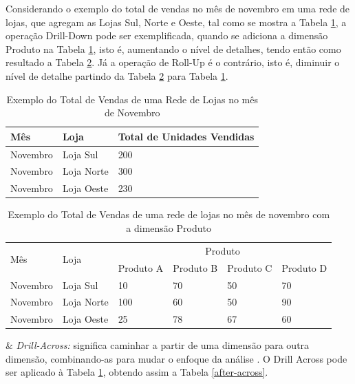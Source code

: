 Considerando o exemplo do total de vendas no mês de novembro em uma rede de lojas, que agregam as Lojas Sul, Norte e Oeste, tal como se mostra a Tabela \ref{before}, a operação Drill-Down pode ser exemplificada, quando se adiciona a dimensão Produto na Tabela \ref{before}, isto é, aumentando o nível de detalhes, tendo então como resultado a Tabela \ref{after}. Já a operação de Roll-Up é o contrário, isto é, diminuir o nível de detalhe partindo da Tabela 
\ref{after} para Tabela \ref{before}.

\begin{table}[!ht]
\centering
\begin{tabular}{|l|l|l|}
\hline
Mês & Loja & Total de Unidades Vendidas \\ \hline
Novembro & Loja Sul & 200                        \\ \hline
Novembro & Loja Norte & 300                        \\ \hline
Novembro & Loja Oeste & 230                        \\ \hline
\end{tabular}
\caption{Exemplo do Total de Vendas de uma Rede de Lojas no mês de Novembro}
\label{before}
\end{table}
\FloatBarrier


\begin{table}[!ht]
\centering
\begin{tabular}{|l|l|l|l|l|l|}
\hline
\multirow{2}{*}{Mês} & \multirow{2}{*}{Loja} & \multicolumn{4}{c|}{Produto}                 \\ \cline{3-6} 
                     &                       & Produto A & Produto B & Produto C & Produto D \\ \hline
Novembro             & Loja Sul              & 10        & 70        & 50        & 70        \\ \hline
Novembro             & Loja Norte            & 100       & 60        & 50        & 90        \\ \hline
Novembro             & Loja Oeste            & 25        & 78        & 67        & 60        \\ \hline
\end{tabular}
\caption{Exemplo do Total de Vendas de uma rede de lojas no mês de novembro com a dimensão Produto}
\label{after}
\end{table}

\begin{easylist}[itemize]

& \textit{Drill-Across:} significa caminhar a partir de uma dimensão para
outra dimensão, combinando-as para mudar o enfoque da
análise \cite{andre2000}. O Drill Across pode ser aplicado à Tabela \ref{before}, obtendo assim a Tabela \ref{after-across}.
\end{easylist}


